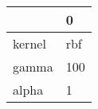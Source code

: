 \begin{tabular}{ll}
\toprule
{} &    0 \\
\midrule
kernel &  rbf \\
gamma  &  100 \\
alpha  &    1 \\
\bottomrule
\end{tabular}
